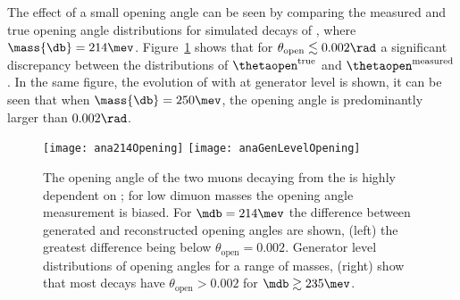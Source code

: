 The effect of a small opening angle can be seen by comparing the measured and true opening angle
distributions for simulated decays of \btokstrdb, where $\mass{\db}=214\mev$.
Figure~\ref{fig:opening:gen} shows that
for $\theta_\mathrm{open}\lesssim0.002\rad$ a significant discrepancy between the distributions of
$\thetaopen^\mathrm{true}$ and $\thetaopen^\mathrm{measured}$.
In the same figure, the evolution of \thetaopen with \mass{\db} at generator level is shown, it can
be seen that when $\mass{\db}=250\mev$, the opening angle is predominantly larger than $0.002\rad$.



\begin{figure}
  \begin{center}
    \texttt{[image: ana214Opening]}
    \texttt{[image: anaGenLevelOpening]}\\
  \end{center}
  \caption{\small
    The opening angle of the two muons decaying from the \db is highly dependent on \mdb; for low
    dimuon masses the opening angle measurement is biased.
    For $\mdb=214\mev$ the difference between generated and reconstructed opening angles are shown,
    (left) the greatest difference being below $\theta_\mathrm{open}=0.002$.
    Generator level distributions of opening angles for a range of masses,
    (right) show that most \db decays have $\theta_\mathrm{open}>0.002$ for
    $\mdb\gtrsim235\mev$.
  }
  \label{fig:opening:gen}
\end{figure}

